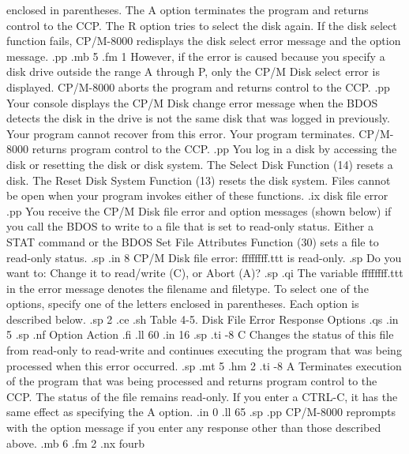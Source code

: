 enclosed in parentheses.  The A option terminates the program and
returns control to the CCP. The R option tries to select the disk
again.  If the disk select function fails, CP/M-8000 redisplays the disk
select error message and the option message. 
.pp
.mb 5
.fm 1
However, if the error is caused because you specify a disk drive outside
the range A through P, only the CP/M Disk select error is
displayed.  CP/M-8000 aborts the program and returns control to the CCP.
.pp
Your console displays the CP/M Disk change error message when the BDOS
detects the disk in the drive is not the same disk that was logged in 
previously. Your program cannot recover 
from this error. Your program
terminates. CP/M-8000 returns program control to the CCP. 
.pp
You log in a disk by accessing the disk or resetting the disk
or disk system.  The Select Disk Function (14) resets a disk. The Reset Disk 
System Function (13) resets the disk system. Files
cannot be open when your program invokes either of these functions. 
.ix disk file error
.pp
You receive the CP/M Disk file error and option messages (shown below) if
you call the BDOS to write to a file that is set to read-only status. 
Either a STAT command or the BDOS Set File Attributes Function (30) sets a
file to read-only status. 
.sp
.in 8
CP/M Disk file error:  ffffffff.ttt is read-only.
.sp
Do you want to: Change it to read/write (C), or Abort (A)?
.sp
.qi
The variable ffffffff.ttt in the error message denotes the filename and
filetype.  To select one of the options, specify one of the letters
enclosed in parentheses. Each option is described below. 
.sp 2
.ce
.sh
Table 4-5.  Disk File Error Response Options
.qs
.in 5
.sp
.nf
Option                         Action 
.fi
.ll 60
.in 16
.sp
.ti -8
C       Changes the status of this file from read-only to 
read-write and continues executing the program that was being 
processed when this error occurred. 
.sp
.mt 5
.hm 2
.ti -8
A       Terminates execution of the program that was being processed
and returns program control to the CCP. The status of the file remains
read-only. If you enter a CTRL-C, it  has the same effect as specifying the
A option. 
.in 0
.ll 65
.sp
.pp
CP/M-8000 reprompts with the option message if you enter any response
other than those described above.
.mb 6
.fm 2
.nx fourb
